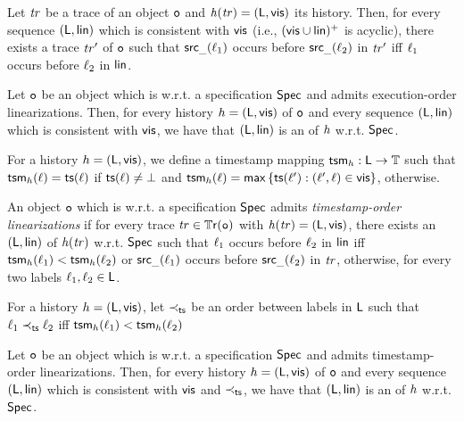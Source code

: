 \begin{lemma}
Let $\mathit{tr}$ be a trace of an object $\mathtt{o}$ and $\mathit{h}({\mathit{tr})}=(\mathsf{L},\mathsf{vis})$ its history. Then, for every sequence $(\mathsf{L},\mathsf{lin})$ which is consistent with $\mathsf{vis}$ (i.e., $(\mathsf{vis}
    \cup \mathsf{lin})^{+}$ is acyclic), there exists a trace $\mathit{tr}'$ of $\mathtt{o}$ such that $\mathsf{src}_{\_}(\ell_1)$ occurs before $\mathsf{src}_{\_}(\ell_2)$ in $\mathit{tr}'$ iff $\ell_1$ occurs before $\ell_2$ in $\mathsf{lin}$.
\end{lemma}

\begin{lemma}
Let $\mathtt{o}$ be an object which is \crdtlinearizable{} w.r.t. a specification $\mathsf{Spec}$ and admits execution-order linearizations. Then, for every history ${h}=(\mathsf{L},\mathsf{vis})$ of $\mathtt{o}$ and every sequence $(\mathsf{L},\mathsf{lin})$ which is consistent with $\mathsf{vis}$, we have that $(\mathsf{L},\mathsf{lin})$ is an \crdtlinearization{} of ${h}$ w.r.t. $\mathsf{Spec}$.
\end{lemma}

For a history ${h}=(\mathsf{L},\mathsf{vis})$, we define a timestamp mapping $\mathsf{tsm}_{{h}}:\mathsf{L}\rightarrow \mathbb{T}$ such that $\mathsf{tsm}_{{h}}(\ell)=\mathsf{ts}(\ell)$ if $\mathsf{ts}(\ell)\neq\bot$ and $\mathsf{tsm}_{{h}}(\ell)=\mathsf{max}\, \{\mathsf{ts}(\ell'):(\ell',\ell)\in \mathsf{vis} \}$, otherwise.


\begin{definition}
An object $\mathtt{o}$ which is \crdtlinearizable{} w.r.t. a specification $\mathsf{Spec}$ admits \emph{timestamp-order linearizations} if for every trace $\mathit{tr}\in\mathbb{T}\mathsf{r}(\mathtt{o})$ with $\mathit{h}({\mathit{tr})}=(\mathsf{L},\mathsf{vis})$, there exists an \crdtlinearization{} $(\mathsf{L},\mathsf{lin})$ of $\mathit{h}({\mathit{tr})}$ w.r.t. $\mathsf{Spec}$ such that $\ell_1$ occurs before $\ell_2$ in $\mathsf{lin}$ iff $\mathsf{tsm}_{{h}}(\ell_1) < \mathsf{tsm}_{{h}}(\ell_2)$ or $\mathsf{src}_{\_}(\ell_1)$ occurs before $\mathsf{src}_{\_}(\ell_2)$ in $\mathit{tr}$, otherwise, for every two labels $\ell_1,\ell_2\in\mathsf{L}$.
\end{definition}

For a history ${h}=(\mathsf{L},\mathsf{vis})$, let $\prec_{\mathsf{ts}}$ be an order between labels in $\mathsf{L}$ such that $\ell_1\prec_{\mathsf{ts}}\ell_2$ iff $\mathsf{tsm}_{{h}}(\ell_1) < \mathsf{tsm}_{{h}}(\ell_2)$

\begin{lemma}
Let $\mathtt{o}$ be an object which is \crdtlinearizable{} w.r.t. a specification $\mathsf{Spec}$ and admits timestamp-order linearizations. Then, for every history ${h}=(\mathsf{L},\mathsf{vis})$ of $\mathtt{o}$ and every sequence $(\mathsf{L},\mathsf{lin})$ which is consistent with $\mathsf{vis}$ and $\prec_{\mathsf{ts}}$, we have that $(\mathsf{L},\mathsf{lin})$ is an \crdtlinearization{} of ${h}$ w.r.t. $\mathsf{Spec}$.
\end{lemma}

